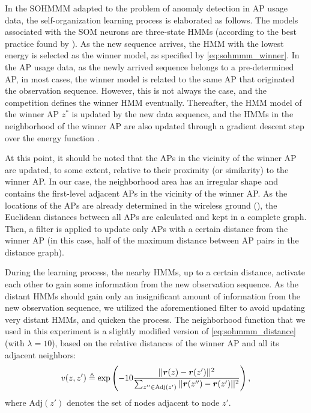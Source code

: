In the SOHMMM adapted to the problem of anomaly detection in AP usage data, the self-organization learning process is elaborated as follows. The models associated with the SOM neurons are three-state HMMs (according to the best practice found by \citet{Anisa2017,Anisa2019}). As the new sequence arrives, the HMM with the lowest energy is selected as the winner model, as specified by \eqref{eq:sohmmm_winner}. In the AP usage data, as the newly arrived sequence belongs to a pre-determined AP, in most cases, the winner model is related to the same AP that originated the observation sequence. However, this is not always the case, and the competition defines the winner HMM eventually. Thereafter, the HMM model of the winner AP $z^*$ is updated by the new data sequence, and the HMMs in the neighborhood of the winner AP are also updated through a gradient descent step over the energy function .

At this point, it should be noted that the APs in the vicinity of the winner AP are updated, to some extent, relative to their proximity (or similarity) to the winner AP. In our case, the neighborhood area has an irregular shape and contains the first-level adjacent APs in the vicinity of the winner AP. As the locations of the APs are already determined in the wireless ground (), the Euclidean distances between all APs are calculated and kept in a complete graph. Then, a filter is applied to update only APs with a certain distance from the winner AP (in this case, half of the maximum distance between AP pairs in the distance graph).

During the learning process, the nearby HMMs, up to a certain distance, activate each other to gain some information from the new observation sequence. As the distant HMMs should gain only an insignificant amount of information from the new observation sequence, we utilized the aforementioned filter to avoid updating very distant HMMs, and quicken the process. The neighborhood function that we used in this experiment is a slightly modified version of \eqref{eq:sohmmm_distance} (with $\lambda=10$), based on the relative distances of the winner AP and all its adjacent neighbors:
\begin{equation}
    v(z,z') \triangleq \exp\left(-10 \frac{||{\bm{r}}(z)-{\bm{r}}(z')||^{2}}{\sum_{z'' \in \mathrm{Adj}(z')}||{\bm{r}}(z'')-{\bm{r}}(z')||^{2}}\right),
    \label{eq:sohmmm_distance_wifi}
\end{equation}
where $\mathrm{Adj}(z')$ denotes the set of nodes adjacent to node $z'$.

